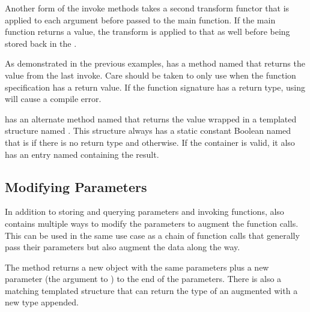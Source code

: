 Another form of the invoke methods takes a second transform functor that is
applied to each argument before passed to the main function. If the main
function returns a value, the transform is applied to that as well before
being stored back in the .



As demonstrated in the previous examples,
 has a method named
 that returns the value from the last invoke. Care
should be taken to only use  when the function
specification has a return value. If the function signature has a
 return type, using  will cause a
compile error.

 has an alternate method named
 that returns the value wrapped in a templated
structure named . This
structure always has a static constant Boolean named  that
is  if there is no return type and 
otherwise. If the container is valid, it also has an entry named
 containing the result.


\subsection{Modifying Parameters}

In addition to storing and querying parameters and invoking functions,
 also contains multiple ways to modify
the parameters to augment the function calls. This can be used in the same
use case as a chain of function calls that generally pass their parameters
but also augment the data along the way.


The  method returns a new
 object with the same parameters plus a
new parameter (the argument to ) to the end of the
parameters. There is also a matching  templated
structure that can return the type of an augmented
 with a new type appended.

